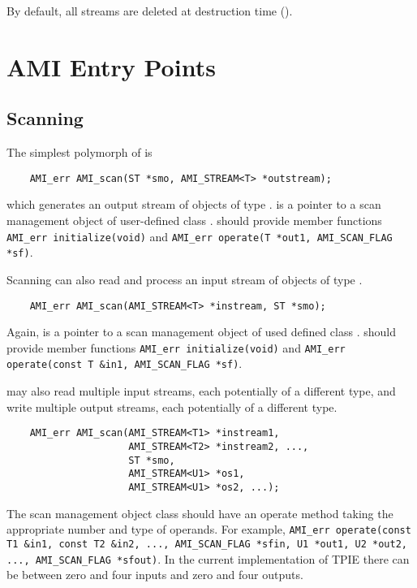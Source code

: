 By default, all streams are deleted at destruction time
().


\section{AMI Entry Points}

\subsection{Scanning}

The simplest polymorph of  is
\begin{verbatim}
    AMI_err AMI_scan(ST *smo, AMI_STREAM<T> *outstream);
\end{verbatim}
which generates an output stream of objects of type .
 is a pointer to a scan management object of user-defined
class .   should provide member functions {\tt
  AMI\_err initialize(void)} and {\tt AMI\_err operate(T *out1,
  AMI\_SCAN\_FLAG *sf)}.

Scanning can also read and process an input stream of objects of type
.  
\begin{verbatim}
    AMI_err AMI_scan(AMI_STREAM<T> *instream, ST *smo);
\end{verbatim}
Again,  is a pointer to a scan management object of used
defined class .   should provide member functions
{\tt AMI\_err initialize(void)} and {\tt AMI\_err operate(const T
  \&in1, AMI\_SCAN\_FLAG *sf)}.

 may also read multiple input streams, each
potentially of a different type, and write multiple output streams,
each potentially of a different type.  
\begin{verbatim}
    AMI_err AMI_scan(AMI_STREAM<T1> *instream1, 
                     AMI_STREAM<T2> *instream2, ..., 
                     ST *smo, 
                     AMI_STREAM<U1> *os1, 
                     AMI_STREAM<U1> *os2, ...);
\end{verbatim}
The scan management object class  should have an operate
method taking the appropriate number and type of operands.  For
example, {\tt AMI\_err operate(const T1 \&in1, const T2 \&in2, ...,
  AMI\_SCAN\_FLAG *sfin, U1 *out1, U2 *out2, ..., AMI\_SCAN\_FLAG
  *sfout)}.  In the current implementation of TPIE there can be
between zero and four inputs and zero and four outputs.


